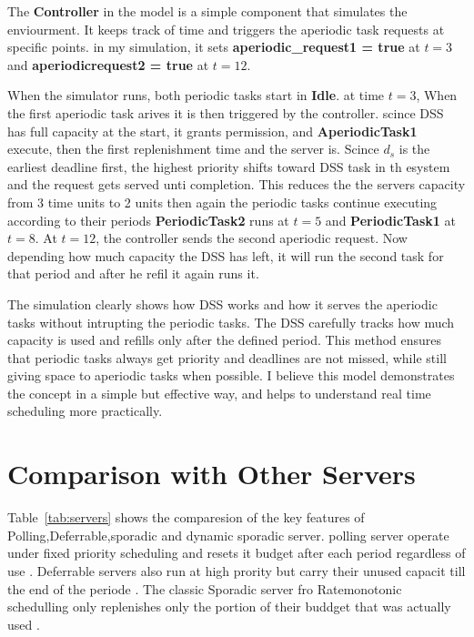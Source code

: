 \documentclass[conference]{IEEEtran}
\begin{document}
The \textbf{Controller} in the model is a simple component that simulates the enviourment. It keeps track of time and triggers the aperiodic task requests at specific points. in my simulation, it sets \textbf{aperiodic\_request1 = true} at $t = 3$ and \textbf{aperiodic\-request2 = true} at $t = 12$. 

When the simulator runs, both periodic tasks start in \textbf{Idle}. at time $t = 3$, When the first aperiodic task arives it is then triggered by the  controller. scince DSS has full capacity at the start, it grants permission, and \textbf{AperiodicTask1} execute, then the first replenishment time and the server is. Scince $d_s$ is the earliest deadline first, the highest priority shifts toward DSS task in th esystem and the request gets served unti completion\cite{buttazzo2011hard}. This reduces the the servers capacity from 3 time units to 2 units then again the periodic tasks continue executing according to their periods \textbf{PeriodicTask2} runs at $t = 5$ and \textbf{PeriodicTask1} at $t = 8$. At $t = 12$, the controller sends the second aperiodic request\cite{buttazzo2011hard}. Now depending how much capacity the DSS has left, it will run the second task for that period and after he refil it again runs it\cite{buttazzo2011hard}.

The simulation clearly shows how DSS works and how it serves the aperiodic tasks without intrupting the periodic tasks. The DSS carefully tracks how much capacity is used and refills only after the defined period. This method ensures that periodic tasks always get priority and deadlines are not missed, while still giving space to aperiodic tasks when possible. I believe this model demonstrates the concept in a simple but effective way, and helps to understand real time scheduling more practically.



\section{Comparison with Other Servers}

Table~\ref{tab:servers} shows the comparesion of the key features of Polling,Deferrable,sporadic and dynamic sporadic server. polling server operate under fixed priority scheduling and resets it budget after each period regardless of use \cite{sprunt1989aperiodic}. Deferrable servers also run at high prority but carry their unused capacit till the end of the periode \cite{buttazzo2011hard}. The classic Sporadic server fro Ratemonotonic schedulling only replenishes only the portion of their buddget that was actually used \cite{sprunt1989aperiodic}.
\end{document}
